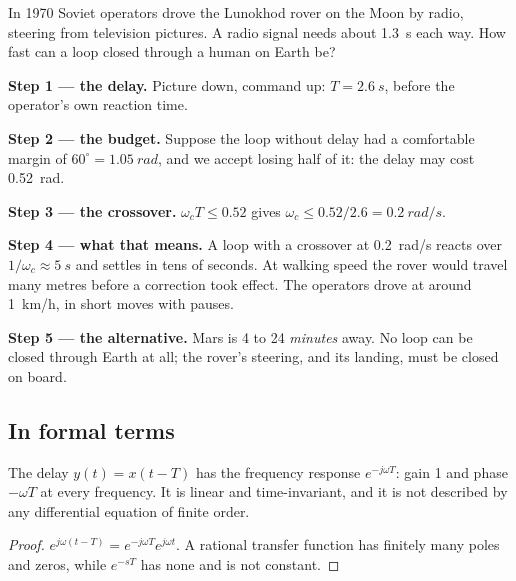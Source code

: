 \begin{example}
\label{ex:slow-moon}
In 1970 Soviet operators drove the Lunokhod rover on the Moon by radio, steering from television pictures. A radio signal needs about \SI{1.3}{s} each way. How fast can a loop closed through a human on Earth be?

\textbf{Step 1 — the delay.} Picture down, command up: $T = \SI{2.6}{s}$, before the operator's own reaction time.

\textbf{Step 2 — the budget.} Suppose the loop without delay had a comfortable margin of $60^\circ = \SI{1.05}{rad}$, and we accept losing half of it: the delay may cost \SI{0.52}{rad}.

\textbf{Step 3 — the crossover.} $\omega_cT \le 0.52$ gives $\omega_c \le 0.52/2.6 = \SI{0.2}{rad/s}$.

\textbf{Step 4 — what that means.} A loop with a crossover at \SI{0.2}{rad/s} reacts over $1/\omega_c \approx \SI{5}{s}$ and settles in tens of seconds. At walking speed the rover would travel many metres before a correction took effect. The operators drove at around \SI{1}{km/h}, in short moves with pauses.

\textbf{Step 5 — the alternative.} Mars is 4 to 24 \emph{minutes} away. No loop can be closed through Earth at all; the rover's steering, and its landing, must be closed on board.
\end{example}

\subsection{In formal terms}

\begin{theorem}
\label{thm:slow-delay}
The delay $y(t) = x(t - T)$ has the frequency response $e^{-j\omega T}$: gain 1 and phase $-\omega T$ at every frequency. It is linear and time-invariant, and it is not described by any differential equation of finite order.
\end{theorem}
\begin{proof}
$e^{j\omega(t - T)} = e^{-j\omega T}e^{j\omega t}$. A rational transfer function has finitely many poles and zeros, while $e^{-sT}$ has none and is not constant.
\end{proof}

